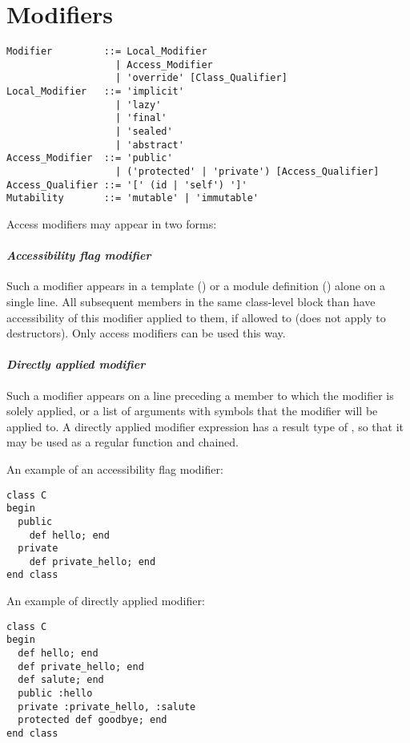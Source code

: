 \section{Modifiers}
\label{sec:modifiers}

\syntax\begin{lstlisting}
Modifier         ::= Local_Modifier
                   | Access_Modifier
                   | 'override' [Class_Qualifier]
Local_Modifier   ::= 'implicit'
                   | 'lazy'
                   | 'final'
                   | 'sealed'
                   | 'abstract'
Access_Modifier  ::= 'public'
                   | ('protected' | 'private') [Access_Qualifier]
Access_Qualifier ::= '[' (id | 'self') ']'
Mutability       ::= 'mutable' | 'immutable'
\end{lstlisting}

Access modifiers may appear in two forms:

\paragraph{\em Accessibility flag modifier}
Such a modifier appears in a template () or a module definition () alone on a single line. All subsequent members in the same class-level block than have accessibility of this modifier applied to them, if allowed to (does not apply to destructors). Only access modifiers can be used this way. 

\paragraph{\em Directly applied modifier}
Such a modifier appears on a line preceding a member to which the modifier is solely applied, or a list of arguments with symbols that the modifier will be applied to. A directly applied modifier expression has a result type of , so that it may be used as a regular function and chained. 

\example An example of an accessibility flag modifier:
\begin{lstlisting}
class C
begin
  public
    def hello; end
  private
    def private_hello; end
end class
\end{lstlisting}

\example An example of directly applied modifier:
\begin{lstlisting}
class C
begin
  def hello; end
  def private_hello; end
  def salute; end
  public :hello
  private :private_hello, :salute
  protected def goodbye; end
end class
\end{lstlisting}

